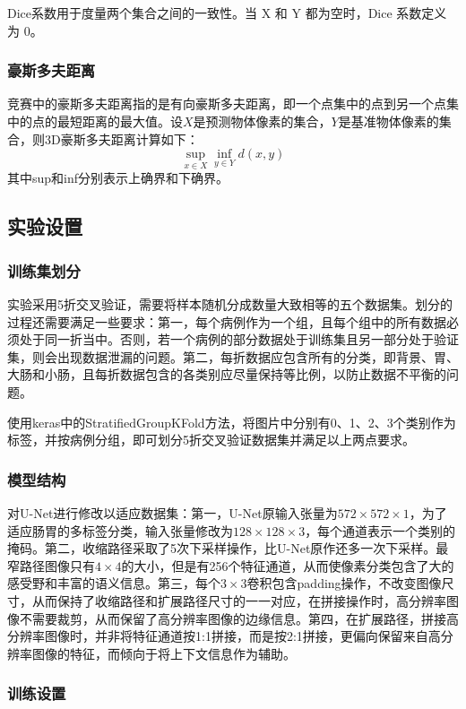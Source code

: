 \documentclass[letterpaper, 10pt, conference, twoside]{ieeeconf}
\begin{document}
Dice系数用于度量两个集合之间的一致性。当 X 和 Y 都为空时，Dice 系数定义为 0。

\subsubsection{豪斯多夫距离}

竞赛中的豪斯多夫距离指的是有向豪斯多夫距离，即一个点集中的点到另一个点集中的点的最短距离的最大值。设$X$是预测物体像素的集合，$Y$是基准物体像素的集合，则3D豪斯多夫距离计算如下：
\[\sup_{x\in X} \inf_{y\in Y} d(x,y)\]
其中sup和inf分别表示上确界和下确界。

\subsection{实验设置}

\subsubsection{训练集划分}

实验采用5折交叉验证，需要将样本随机分成数量大致相等的五个数据集。划分的过程还需要满足一些要求：第一，每个病例作为一个组，且每个组中的所有数据必须处于同一折当中。否则，若一个病例的部分数据处于训练集且另一部分处于验证集，则会出现数据泄漏的问题。第二，每折数据应包含所有的分类，即背景、胃、大肠和小肠，且每折数据包含的各类别应尽量保持等比例，以防止数据不平衡的问题。

使用keras中的StratifiedGroupKFold方法，将图片中分别有0、1、2、3个类别作为标签，并按病例分组，即可划分5折交叉验证数据集并满足以上两点要求。

\subsubsection{模型结构}

对U-Net进行修改以适应数据集：第一，U-Net原输入张量为$572\times 572\times 1$，为了适应肠胃的多标签分类，输入张量修改为$128\times 128\times 3$，每个通道表示一个类别的掩码。第二，收缩路径采取了5次下采样操作，比U-Net原作还多一次下采样。最窄路径图像只有$4\times 4$的大小，但是有256个特征通道，从而使像素分类包含了大的感受野和丰富的语义信息。第三，每个$3\times 3$卷积包含padding操作，不改变图像尺寸，从而保持了收缩路径和扩展路径尺寸的一一对应，在拼接操作时，高分辨率图像不需要裁剪，从而保留了高分辨率图像的边缘信息。第四，在扩展路径，拼接高分辨率图像时，并非将特征通道按1:1拼接，而是按2:1拼接，更偏向保留来自高分辨率图像的特征，而倾向于将上下文信息作为辅助。

\subsubsection{训练设置}
\end{document}
